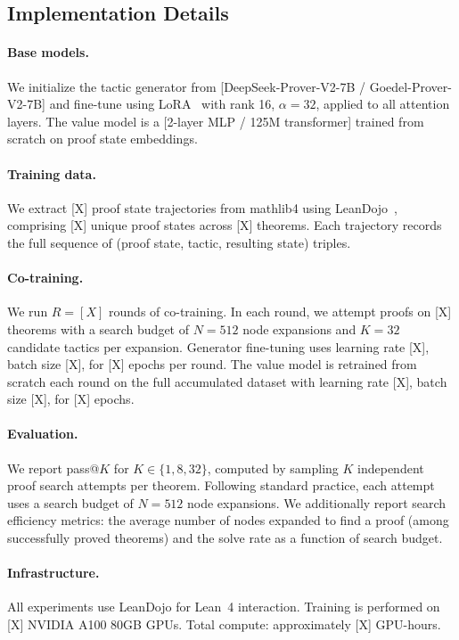 \documentclass{article}
\begin{document}
\subsection{Implementation Details}

\paragraph{Base models.} We initialize the tactic generator from [DeepSeek-Prover-V2-7B / Goedel-Prover-V2-7B] and fine-tune using LoRA~\citep{hu2022lora} with rank 16, $\alpha = 32$, applied to all attention layers. The value model is a [2-layer MLP / 125M transformer] trained from scratch on proof state embeddings.

\paragraph{Training data.} We extract [X] proof state trajectories from mathlib4 using LeanDojo~\citep{yang2023leandojo}, comprising [X] unique proof states across [X] theorems. Each trajectory records the full sequence of (proof state, tactic, resulting state) triples.

\paragraph{Co-training.} We run $R = [X]$ rounds of co-training. In each round, we attempt proofs on [X] theorems with a search budget of $N = 512$ node expansions and $K = 32$ candidate tactics per expansion. Generator fine-tuning uses learning rate [X], batch size [X], for [X] epochs per round. The value model is retrained from scratch each round on the full accumulated dataset with learning rate [X], batch size [X], for [X] epochs.

\paragraph{Evaluation.} We report pass@$K$ for $K \in \{1, 8, 32\}$, computed by sampling $K$ independent proof search attempts per theorem. Following standard practice, each attempt uses a search budget of $N = 512$ node expansions. We additionally report search efficiency metrics: the average number of nodes expanded to find a proof (among successfully proved theorems) and the solve rate as a function of search budget.

\paragraph{Infrastructure.} All experiments use LeanDojo for Lean~4 interaction. Training is performed on [X] NVIDIA A100 80GB GPUs. Total compute: approximately [X] GPU-hours.
\end{document}
